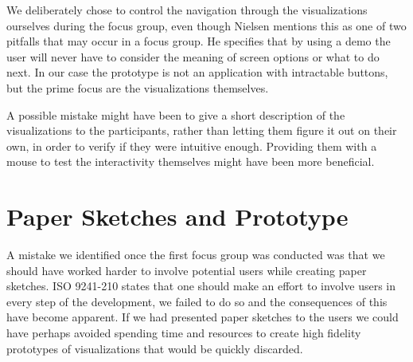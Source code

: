 We deliberately chose to control the navigation through the visualizations ourselves during the focus group, even though Nielsen mentions this as one of two pitfalls that may occur in a focus group. He specifies that by using a demo the user will never have to consider the meaning of screen options or what to do next. In our case the prototype is not an application with intractable buttons, but the prime focus are the visualizations themselves. 

A possible mistake might have been to give a short description of the visualizations to the participants, rather than letting them figure it out on their own, in order to verify if they were intuitive enough. Providing them with a mouse to test the interactivity themselves might have been more beneficial.

\section{Paper Sketches and Prototype}
A mistake we identified once the first focus group was conducted was that we should have worked harder to involve potential users while creating paper sketches. ISO 9241-210 states that one should make an effort to involve users in every step of the development, we failed to do so and the consequences of this have become apparent. If we had presented paper sketches to the users we could have perhaps avoided spending time and resources to create high fidelity prototypes of visualizations that would be quickly discarded.
